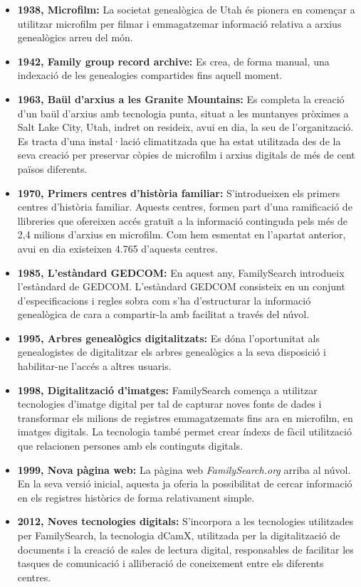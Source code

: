     \begin{itemize}
        \item \textbf{1938, Microfilm:} La societat genealògica de Utah és pionera en començar a utilitzar microfilm per filmar i emmagatzemar informació relativa a arxius genealògics arreu del món.
        \item \textbf{1942, Family group record archive:} Es crea, de forma manual, una indexació de les genealogies compartides fins aquell moment.
        \item \textbf{1963, Baül d’arxius a les Granite Mountains:} Es completa la creació d’un baül d’arxius amb tecnologia punta, situat a les muntanyes pròximes a Salt Lake City, Utah, indret on resideix, avui en dia, la seu de l’organització. Es tracta d’una instal·lació climatitzada que ha estat utilitzada des de la seva creació per preservar còpies de microfilm i arxius digitals de més de cent països diferents.
        \item \textbf{1970, Primers centres d'història familiar:} S'introdueixen els primers centres d'història familiar. Aquests centres, formen part d'una ramificació de llibreries que ofereixen accés gratuït a la informació continguda pels més de 2,4 milions d'arxius en microfilm. Com hem esmentat en l'apartat anterior, avui en dia existeixen 4.765 d'aquests centres.
        \item \textbf{1985, L’estàndard GEDCOM:} En aquest any, FamilySearch introdueix l'estàndard de \gls{GEDCOM}. L'estàndard GEDCOM consisteix en un conjunt d'especificacions i regles sobra com s'ha d'estructurar la informació genealògica de cara a compartir-la amb facilitat a través del núvol.
        \item \textbf{1995, Arbres genealògics digitalitzats:} Es dóna l’oportunitat als ge\-nea\-lo\-gis\-tes de digitalitzar els arbres genealògics a la seva disposició i habilitar-ne l’accés a altres usuaris.
        \item \textbf{1998, Digitalització d’imatges:} FamilySearch comença a utilitzar tecnologies d'imatge digital per tal de capturar noves fonts de dades i transformar els milions de registres emmagatzemats fins ara en microfilm, en imatges digitals. La tecnologia també permet crear índexs de fàcil utilització que relacionen persones amb els continguts digitals.
        \item \textbf{1999, Nova pàgina web:} La pàgina web \emph{FamilySearch.org} arriba al núvol. En la seva versió inicial, aquesta ja oferia la possibilitat de cercar informació en els registres històrics de forma relativament simple.
        \item \textbf{2012, Noves tecnologies digitals:} S’incorpora a les tecnologies utilitzades per FamilySearch, la tecnologia dCamX, utilitzada per la digitalització de do\-cu\-ments i la creació de sales de lectura digital, responsables de facilitar les tasques de comunicació i alliberació de coneixement entre els diferents centres.
    \end{itemize}

